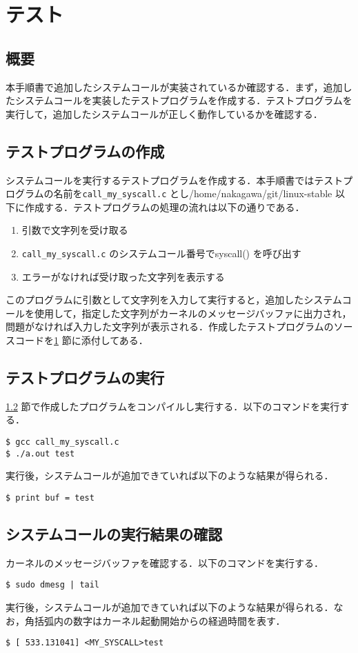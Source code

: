 \documentclass[12pt]{jsarticle}
\begin{document}
\section{テスト}\label{sec:test}
 \subsection{概要}
 本手順書で追加したシステムコールが実装されているか確認する．まず，追加したシステムコールを実装したテストプログラムを作成する．テストプログラムを実行して，追加したシステムコールが正しく動作しているかを確認する．
\subsection{テストプログラムの作成}\label{sec:test_sakusei}
システムコールを実行するテストプログラムを作成する．本手順書ではテストプログラムの名前を\verb|call_my_syscall.c| とし/home/nakagawa/git/linux-stable 以下に作成する．テストプログラムの処理の流れは以下の通りである．
\begin{enumerate}
 \item 引数で文字列を受け取る
 \item \verb|call_my_syscall.c| のシステムコール番号でsyscall() を呼び出す
 \item エラーがなければ受け取った文字列を表示する
\end{enumerate}
このプログラムに引数として文字列を入力して実行すると，追加したシステムコールを使用して，指定した文字列がカーネルのメッセージバッファに出力され，問題がなければ入力した文字列が表示される．作成したテストプログラムのソースコードを\ref{sec:test} 節に添付してある．
\subsection{テストプログラムの実行}
\ref{sec:test_sakusei} 節で作成したプログラムをコンパイルし実行する．以下のコマンドを実行する．
\begin{verbatim}
$ gcc call_my_syscall.c
$ ./a.out test
\end{verbatim}
実行後，システムコールが追加できていれば以下のような結果が得られる．
\begin{verbatim}
$ print buf = test
\end{verbatim}
\subsection{システムコールの実行結果の確認}
カーネルのメッセージバッファを確認する．以下のコマンドを実行する．
\begin{verbatim}
$ sudo dmesg | tail
\end{verbatim}
実行後，システムコールが追加できていれば以下のような結果が得られる．なお，角括弧内の数字はカーネル起動開始からの経過時間を表す．
\begin{verbatim}
$ [ 533.131041] <MY_SYSCALL>test
\end{verbatim}
\end{document}
